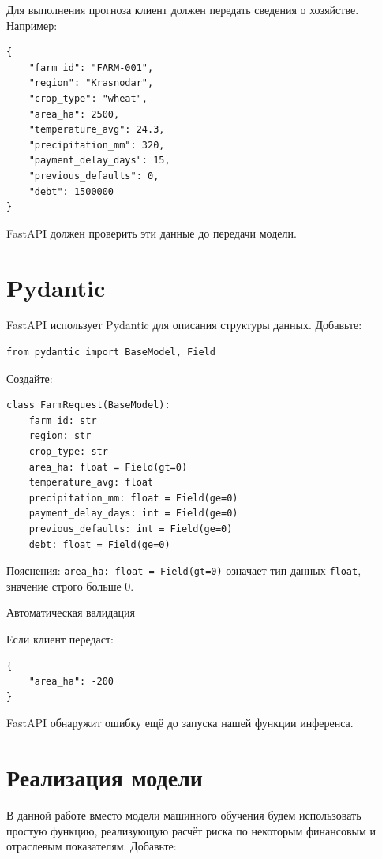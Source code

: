 \documentclass[12pt,a4paper]{article}
\begin{document}
Для выполнения прогноза клиент должен передать сведения о хозяйстве. Например:

\begin{lstlisting}[caption={Пример входных данных}]
{
    "farm_id": "FARM-001",
    "region": "Krasnodar",
    "crop_type": "wheat",
    "area_ha": 2500,
    "temperature_avg": 24.3,
    "precipitation_mm": 320,
    "payment_delay_days": 15,
    "previous_defaults": 0,
    "debt": 1500000
}
\end{lstlisting}

FastAPI должен проверить эти данные до передачи модели.

\section{Pydantic}

FastAPI использует Pydantic для описания структуры данных. Добавьте:

\begin{lstlisting}[caption={Импорт Pydantic}]
from pydantic import BaseModel, Field
\end{lstlisting}

Создайте:

\begin{lstlisting}[caption={Модель FarmRequest}]
class FarmRequest(BaseModel):
    farm_id: str
    region: str
    crop_type: str
    area_ha: float = Field(gt=0)
    temperature_avg: float
    precipitation_mm: float = Field(ge=0)
    payment_delay_days: int = Field(ge=0)
    previous_defaults: int = Field(ge=0)
    debt: float = Field(ge=0)
\end{lstlisting}

Пояснения: \texttt{area\_ha: float = Field(gt=0)} означает тип данных \texttt{float}, значение строго больше 0.

{Автоматическая валидация}

Если клиент передаст:

\begin{lstlisting}[caption={Некорректный запрос}]
{
    "area_ha": -200
}
\end{lstlisting}

FastAPI обнаружит ошибку ещё до запуска нашей функции инференса.

\section{Реализация модели}

В данной работе вместо модели машинного обучения будем использовать простую функцию, реализующую расчёт риска по некоторым финансовым и отраслевым показателям. Добавьте:
\end{document}

